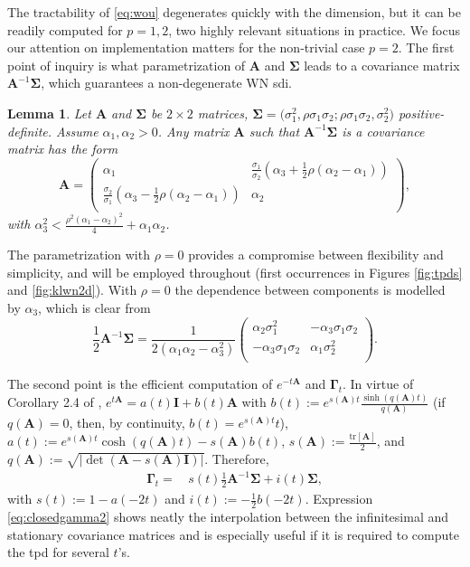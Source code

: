 \documentclass[oneside,11pt]{article}
\newcommand{\bSigma}{\boldsymbol\Sigma}
\newcommand{\bGamma}{\boldsymbol\Gamma}
\newcommand{\bA}{\mathbf{A}}
\newcommand{\bI}{\mathbf{I}}
\newcommand{\lrp}[1]{\left(#1\right)}
\newcommand{\abs}[1]{\left| #1\right|}
\newcommand{\tr}[1]{\mathrm{tr}\left[#1\right]}
\newtheorem{lem}{Lemma}
\begin{document}
The tractability of \eqref{eq:wou} degenerates quickly with the dimension, but it can be readily computed for $p=1,2$, two highly relevant situations in practice. We focus our attention on implementation matters for the non-trivial case $p=2$. The first point of inquiry is what parametrization of $\bA$ and $\bSigma$ leads to a covariance matrix $\bA^{-1}\bSigma$, which guarantees a non-degenerate WN sdi.
\begin{lem}
Let $\bA$ and $\bSigma$ be $2\times 2$ matrices, $\bSigma=\big(
\sigma_1^2,\allowbreak \rho\sigma_{1}\sigma_{2};
\rho\sigma_{1}\sigma_{2}, \sigma_2^2\big)$ positive-definite. Assume $\alpha_1,\alpha_2>0$. Any matrix $\bA$ such that $\bA^{-1}\bSigma$ is a covariance matrix has the form
\[
\bA=\begin{pmatrix}
\alpha_1 & \frac{\sigma_1}{\sigma_2}\lrp{\alpha_3+\tfrac{1}{2}\rho(\alpha_2-\alpha_1)}\\
\frac{\sigma_2}{\sigma_1}\lrp{\alpha_3-\tfrac{1}{2}\rho(\alpha_2-\alpha_1)} & \alpha_2\\
\end{pmatrix},
\]
with $\alpha_3^2<\frac{\rho^2(\alpha_1-\alpha_2)^2}{4}+\alpha_1\alpha_2$.
\end{lem}
The parametrization with $\rho=0$ provides a compromise between flexibility and simplicity, and will be employed throughout (first occurrences in Figures \ref{fig:tpds} and \ref{fig:klwn2d}). With $\rho=0$ the dependence between components is modelled by $\alpha_3$, which is clear from
\[
\frac{1}{2}\bA^{-1}\bSigma=\frac{1}{2(\alpha_1\alpha_2-\alpha_3^2)}
\begin{pmatrix}
\alpha_2 \sigma_1^2 & -\alpha_3 \sigma_1 \sigma_2 \\
-\alpha_3 \sigma_1 \sigma_2 & \alpha_1 \sigma_2^2 \\
\end{pmatrix}.
\]

The second point is the efficient computation of $e^{-t\bA}$ and $\bGamma_t$. In virtue of Corollary 2.4 of \cite{Bernstein1993}, $e^{t\bA}=a(t)\bI + b(t)\bA$ with $b(t):=e^{s(\bA)t}\tfrac{\sinh(q(\bA)t)}{q(\bA)}$ (if $q(\bA)=0$, then, by continuity, $b(t)=e^{s(\bA)t}t$), $a(t):=e^{s(\bA)t}\cosh(q(\bA)t)-s(\bA)b(t)$, $s(\bA):=\tfrac{\tr{\bA}}{2}$, and $q(\bA):=\sqrt{\abs{\det(\bA-s(\bA)\bI)}}$. Therefore,
\begin{align}
\bGamma_t
=&\,s(t)\frac{1}{2}\bA^{-1}\bSigma + i(t)\bSigma,\label{eq:closedgamma2}
\end{align}
with $s(t):=1-a(-2t)$ and $i(t):=-\tfrac{1}{2}b(-2t)$. Expression \eqref{eq:closedgamma2} shows neatly the interpolation between the infinitesimal and stationary covariance matrices and is especially useful if it is required to compute the tpd for several $t$'s.\\
\end{document}

